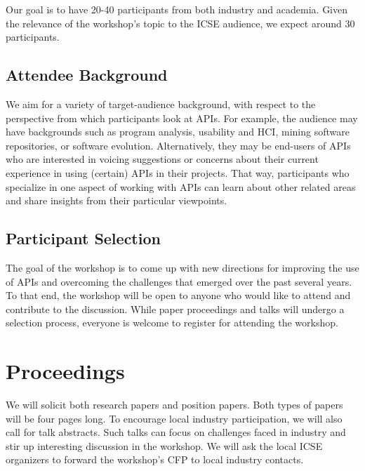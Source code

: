 \documentclass[10pt, conference]{IEEEtran}
\begin{document}
Our goal is to have 20-40 participants from both industry and academia. Given the relevance of the workshop's topic to the ICSE audience, we expect around 30 participants.

\subsection{Attendee Background} 
We aim for a variety of target-audience background, with respect to the perspective from which participants look at APIs. For example, the audience may have backgrounds such as program analysis, usability and HCI, mining software repositories, or software evolution. Alternatively, they may be end-users of APIs who are interested in voicing suggestions or concerns about their current experience in using (certain) APIs in their projects. That way, participants who specialize in one aspect of working with APIs can learn about other related areas and share insights from their particular viewpoints.

\subsection{Participant Selection}
The goal of the workshop is to come up with new directions for improving the use of APIs and overcoming the challenges that emerged over the past several years. To that end, the workshop will be open to anyone who would like to attend and contribute to the discussion. While paper proceedings and talks will undergo a selection process, everyone is welcome to register for attending the workshop. 

\section{Proceedings}

We will solicit both research papers and position papers. Both types of papers will be four pages long. To encourage local industry participation, we will also call for talk abstracts. Such talks can focus on challenges faced in industry and stir up interesting discussion in the workshop. We will ask the local ICSE organizers to forward the workshop's CFP to local industry contacts.
\end{document}
